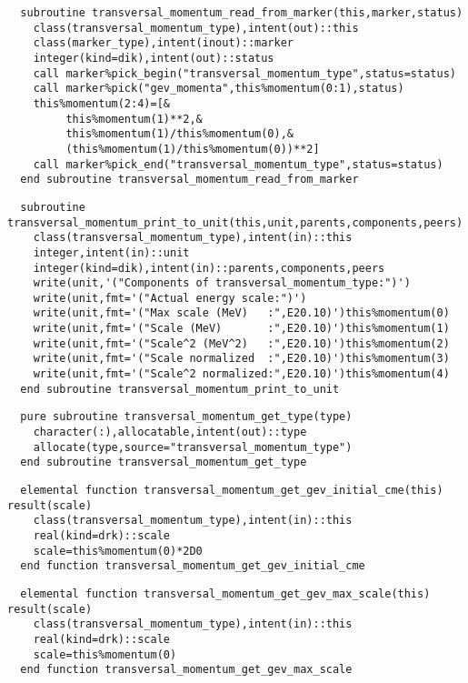 \begin{Verbatim}
  subroutine transversal_momentum_read_from_marker(this,marker,status)
    class(transversal_momentum_type),intent(out)::this
    class(marker_type),intent(inout)::marker
    integer(kind=dik),intent(out)::status
    call marker%pick_begin("transversal_momentum_type",status=status)
    call marker%pick("gev_momenta",this%momentum(0:1),status)
    this%momentum(2:4)=[&
         this%momentum(1)**2,&
         this%momentum(1)/this%momentum(0),&
         (this%momentum(1)/this%momentum(0))**2]
    call marker%pick_end("transversal_momentum_type",status=status)
  end subroutine transversal_momentum_read_from_marker
\end{Verbatim}
\begin{Verbatim}
  subroutine transversal_momentum_print_to_unit(this,unit,parents,components,peers)
    class(transversal_momentum_type),intent(in)::this
    integer,intent(in)::unit
    integer(kind=dik),intent(in)::parents,components,peers
    write(unit,'("Components of transversal_momentum_type:")')
    write(unit,fmt='("Actual energy scale:")')
    write(unit,fmt='("Max scale (MeV)   :",E20.10)')this%momentum(0)
    write(unit,fmt='("Scale (MeV)       :",E20.10)')this%momentum(1)
    write(unit,fmt='("Scale^2 (MeV^2)   :",E20.10)')this%momentum(2)
    write(unit,fmt='("Scale normalized  :",E20.10)')this%momentum(3)
    write(unit,fmt='("Scale^2 normalized:",E20.10)')this%momentum(4)
  end subroutine transversal_momentum_print_to_unit
  \end{Verbatim}
\begin{Verbatim}
  pure subroutine transversal_momentum_get_type(type)
    character(:),allocatable,intent(out)::type
    allocate(type,source="transversal_momentum_type")
  end subroutine transversal_momentum_get_type
\end{Verbatim}
\begin{Verbatim}
  elemental function transversal_momentum_get_gev_initial_cme(this) result(scale)
    class(transversal_momentum_type),intent(in)::this
    real(kind=drk)::scale
    scale=this%momentum(0)*2D0
  end function transversal_momentum_get_gev_initial_cme
\end{Verbatim}

\begin{Verbatim}
  elemental function transversal_momentum_get_gev_max_scale(this) result(scale)
    class(transversal_momentum_type),intent(in)::this
    real(kind=drk)::scale
    scale=this%momentum(0)
  end function transversal_momentum_get_gev_max_scale
\end{Verbatim}

